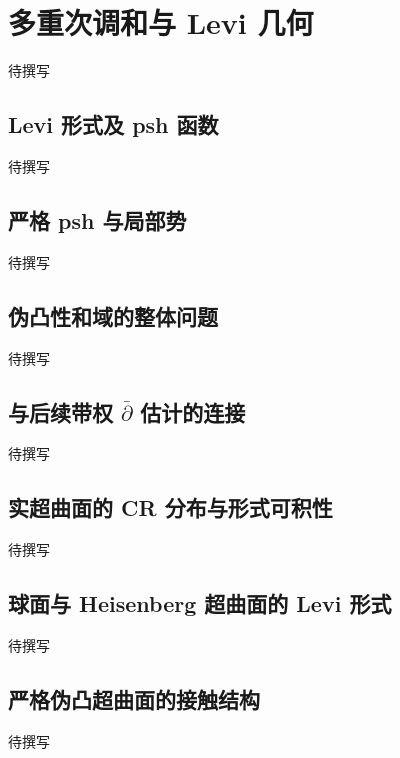 
% 
% 
% 
% 
% 
% 

\section{多重次调和与 Levi 几何}
\label{g4:sec:1405}

待撰写

\subsection{Levi 形式及 psh 函数}
\label{g4:subsec:1405:01}
待撰写

\subsection{严格 psh 与局部势}
\label{g4:subsec:1405:02}
待撰写

\subsection{伪凸性和域的整体问题}
\label{g4:subsec:1405:03}
待撰写

\subsection{\texorpdfstring{与后续带权 \(\bar{\partial}\) 估计的连接}{与后续带权 \={∂} 估计的连接}}
\label{g4:subsec:1405:04}
待撰写

\subsection{实超曲面的 CR 分布与形式可积性}
\label{g4:subsec:1405:05}
待撰写

\subsection{球面与 Heisenberg 超曲面的 Levi 形式}
\label{g4:subsec:1405:06}
待撰写

\subsection{严格伪凸超曲面的接触结构}
\label{g4:subsec:1405:07}
待撰写

